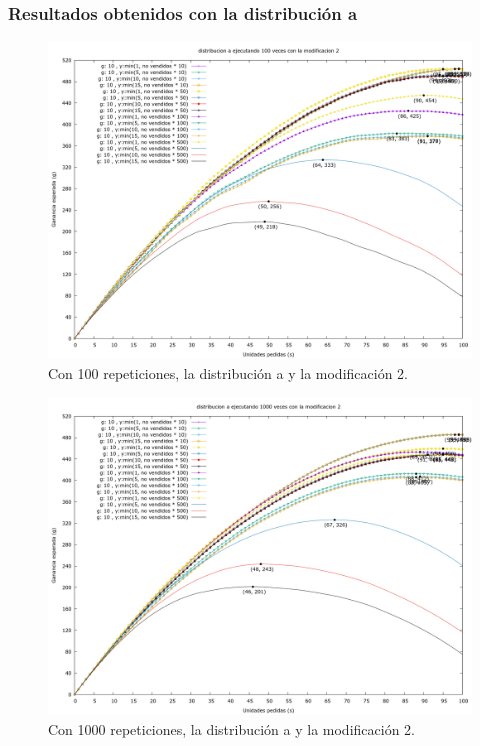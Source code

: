 \documentclass[12pt, spanish]{article}
\begin{document}
\subsubsection{Resultados obtenidos con la distribución a}


\begin{figure}[H]
	\centering
	\includegraphics[scale = 0.3]{prob_a/datos_a_100_2.png}
	\caption{Con 100 repeticiones, la distribución a y la modificación 2.}
	\label{fig:ej1_a_100}

\end{figure}

\begin{figure}[H]
	\centering
	\includegraphics[scale = 0.3]{prob_a/datos_a_1000_2.png}
	\caption{Con 1000 repeticiones, la distribución a y la modificación 2.}
	\label{fig:ej1_a_1000}

\end{figure}
\end{document}
